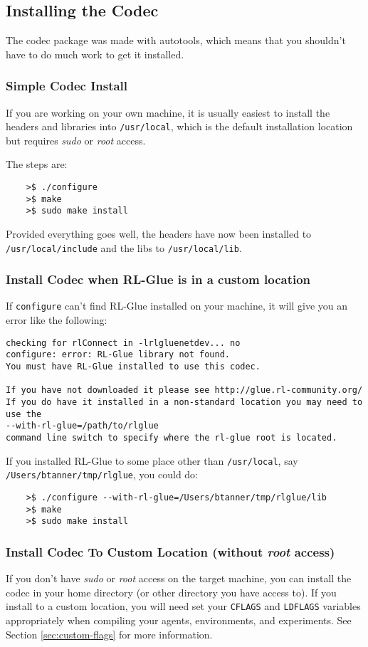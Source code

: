 \documentclass[11pt]{article}
\begin{document}
\subsection{Installing the Codec}
The codec package was made with autotools, which means that you shouldn't have to do much work to get it installed.  

\subsubsection{Simple Codec Install}
If you are working on your own machine, it is usually easiest to install the headers and libraries into \texttt{/usr/local}, which is the default installation location but requires \textit{sudo} or \textit{root} access.

The steps are:
\begin{verbatim}
	>$ ./configure
	>$ make
	>$ sudo make install
\end{verbatim}

Provided everything goes well, the headers have now been installed to \texttt{/usr/local/include} and the libs to \texttt{/usr/local/lib}.

\subsubsection{Install Codec when RL-Glue is in a custom location}

If \texttt{configure} can't find RL-Glue installed on your machine, it will give you an error like the following:
\begin{verbatim}
checking for rlConnect in -lrlgluenetdev... no
configure: error: RL-Glue library not found.
You must have RL-Glue installed to use this codec. 
	
If you have not downloaded it please see http://glue.rl-community.org/
If you do have it installed in a non-standard location you may need to use the 
--with-rl-glue=/path/to/rlglue 
command line switch to specify where the rl-glue root is located.
\end{verbatim}

If you installed RL-Glue to some place other than \texttt{/usr/local}, say \texttt{/Users/btanner/tmp/rlglue}, you could do:
\begin{verbatim}
	>$ ./configure --with-rl-glue=/Users/btanner/tmp/rlglue/lib
	>$ make
	>$ sudo make install
\end{verbatim}

\subsubsection{Install Codec To Custom Location (without \textit{root} access)}
If you don't have \textit{sudo} or \textit{root} access on the target machine, you can install the codec in your home directory (or other directory you have access to).
If you install to a custom location, you will need set your \texttt{CFLAGS} and \texttt{LDFLAGS} variables appropriately when compiling your agents, environments, and experiments. See Section \ref{sec:custom-flags} for more information.
\end{document}
